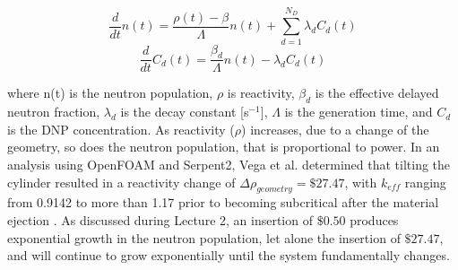 \documentclass[11pt,a4paper]{article}
\begin{document}
\begin{equation}
\frac{d}{dt}n(t) = \frac{\rho(t) - \beta}{\Lambda} n(t) + \sum_{d=1}^{N_D} \lambda_{d}C_{d}(t)
\end{equation}
\begin{equation}
\frac{d}{dt}C_{d}(t) = \frac{\beta_{d}}{\Lambda} n(t) - \lambda_{d}C_{d}(t)
\end{equation}

where n(t) is the neutron population, $\rho$ is reactivity, $\beta_{d}$ is the effective delayed neutron fraction, $\lambda_{d}$ is the decay constant [s$^{-1}$], $\Lambda$ is the generation time, and $C_{d}$ is the DNP concentration. As reactivity ($\rho$) increases, due to a change of the geometry, so does the neutron population, that is proportional to power. In an analysis using OpenFOAM and Serpent2, Vega et al. determined that tilting the cylinder resulted in a reactivity change of $\Delta\rho_{geometry} = \$27.47$, with $k_{eff}$ ranging from 0.9142 to more than 1.17 prior to becoming subcritical after the material ejection \cite{Vega2015}. As discussed during Lecture 2, an insertion of $\$0.50$ produces exponential growth in the neutron population, let alone the insertion of $\$27.47$, and will continue to grow exponentially until the system fundamentally changes.




\end{document}
